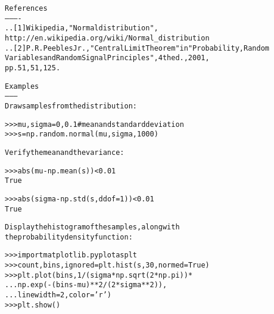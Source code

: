 \begin{boxedminipage}{\funcwidth}
\begin{alltt}
References
----------
.. [1] Wikipedia, "Normal distribution",
       http://en.wikipedia.org/wiki/Normal\_distribution
.. [2] P. R. Peebles Jr., "Central Limit Theorem" in "Probability, Random
       Variables and Random Signal Principles", 4th ed., 2001,
       pp. 51, 51, 125.

Examples
--------
Draw samples from the distribution:

{\textgreater}{\textgreater}{\textgreater} mu, sigma = 0, 0.1 \# mean and standard deviation
{\textgreater}{\textgreater}{\textgreater} s = np.random.normal(mu, sigma, 1000)

Verify the mean and the variance:

{\textgreater}{\textgreater}{\textgreater} abs(mu - np.mean(s)) {\textless} 0.01
True

{\textgreater}{\textgreater}{\textgreater} abs(sigma - np.std(s, ddof=1)) {\textless} 0.01
True

Display the histogram of the samples, along with
the probability density function:

{\textgreater}{\textgreater}{\textgreater} import matplotlib.pyplot as plt
{\textgreater}{\textgreater}{\textgreater} count, bins, ignored = plt.hist(s, 30, normed=True)
{\textgreater}{\textgreater}{\textgreater} plt.plot(bins, 1/(sigma * np.sqrt(2 * np.pi)) *
...                np.exp( - (bins - mu)**2 / (2 * sigma**2) ),
...          linewidth=2, color='r')
{\textgreater}{\textgreater}{\textgreater} plt.show()
\end{alltt}

\setlength{\parskip}{1ex}
    \end{boxedminipage}

    \label{QSTK:qstklearn:mldiagnostics:pareto}

    \vspace{0.5ex}

